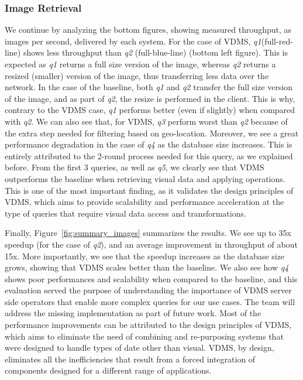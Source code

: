 \subsubsection{Image Retrieval}

We continue by analyzing the bottom figures, showing measured throughput,
as images per second, delivered by each system.
For the case of VDMS, \textit{q1}(full-red-line) shows less throughput
than \textit{q2} (full-blue-line) (bottom left figure).
This is expected as \textit{q1} returns a full size version of the image,
whereas \textit{q2} returns a resized (smaller) version of the image,
thus transferring less data over the network.
In the case of the baseline, both \textit{q1} and \textit{q2} transfer
the full size version of the image, and as part of \textit{q2},
the resize is performed in the client.
This is why, contrary to the VDMS case, \textit{q1} performs better (even if slightly)
when compared with \textit{q2}.
We can also see that, for VDMS, \textit{q3} perform worst than \textit{q2} because
of the extra step needed for filtering based on geo-location.
Moreover, we see a great performance degradation in the case of \textit{q4} as the
database size increases.
This is entirely attributed to the 2-round process needed for this query,
as we explained before.
From the first 3 queries, as well as \textit{q5},
we clearly see that VDMS outperforms the baseline
when retrieving visual data and applying operations.
This is one of the most important finding, as it validates the design principles
of VDMS, which aims to provide scalability and performance acceleration
at the type of queries that require visual data access and transformations.



Finally, Figure~\ref{fig:summary_images} summarizes the results.
We see up to 35x speedup (for the case of \textit{q2}),
and an average improvement in throughput of about 15x.
More importantly, we see that the speedup increases as the database size grows,
showing that VDMS scales better than the baseline.
We also see how \textit{q4} shows poor performances and scalability
when compared to the baseline, and this evaluation served the
purpose of understanding the importance of VDMS server side operators
that enable more complex queries for our use cases.
The team will address the missing implementation as part of future work.
Most of the performance improvements can be attributed to the design
principles of VDMS, which aims to eliminate the need of combining and
re-purposing systems that were designed to handle types of date other than visual.
VDMS, by design, eliminates all the inefficiencies that result
from a forced integration of components designed for a
different range of applications.



% 



% 

